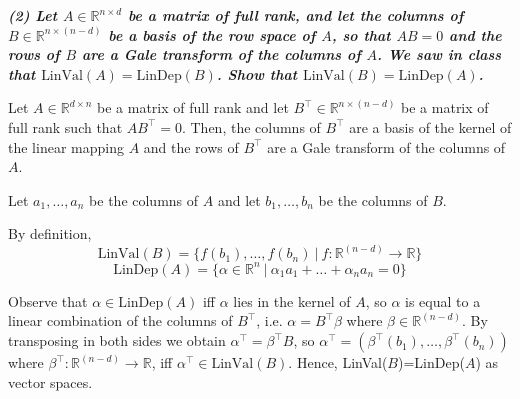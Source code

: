 \textbf{\textit{(2) Let $A \in \mathbb{R}^{n\times d}$ be a matrix of full rank, and let the columns of $B \in \mathbb{R}^{n \times (n -d)}$ be a basis of the row space of $A$, so that $AB = 0$ and the rows of $B$ are a Gale transform of the columns of $A$. We saw in class that $\text{LinVal}(A) = \text{LinDep}(B)$. Show that $\text{LinVal}(B) = \text{LinDep}(A)$.}}

\vspace{3pt}

Let $A\in \mathbb{R}^{d\times n}$ be a matrix of full rank and let $B^\top\in \mathbb{R}^{n\times(n-d)}$ be a matrix of full rank such that $AB^\top=0$. Then, the columns of $B^\top$ are a basis of the kernel of the linear mapping $A$ and the rows of $B^\top$ are a Gale transform of the columns of $A$.

\espai

Let ${a_1,\dots,a_n}$ be the columns of $A$ and let ${b_1,\dots,b_n}$ be the columns of $B$.

By definition,
$$\text{LinVal}(B)=\{f(b_1),\dots,f(b_n) \ | \ f:\mathbb{R}^{(n-d)}\rightarrow \mathbb{R}\}$$
$$\text{LinDep}(A)=\{\alpha\in\mathbb{R}^n \ | \ \alpha_1a_1+\dots+\alpha_na_n=0\}$$

Observe that $\alpha\in \text{LinDep}(A)$ iff $\alpha$ lies in the kernel of $A$, so $\alpha$ is equal to a linear combination of the columns of $B^\top$, i.e. $\alpha = B^\top \beta$ where $\beta\in\mathbb{R}^{(n-d)}$. By transposing in both sides we obtain $\alpha^\top = \beta^\top B$, so $\alpha^\top = (\beta^\top(b_1),\dots,\beta^\top(b_n))$ where $\beta^\top:\mathbb{R}^{(n-d)}\rightarrow \mathbb{R}$, iff $\alpha^\top\in\text{LinVal}(B)$. Hence, LinVal($B$)=LinDep($A$) as vector spaces.
